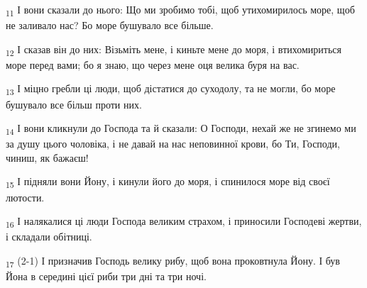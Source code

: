 \begin{tcolorbox}
\textsubscript{11} І вони сказали до нього: Що ми зробимо тобі, щоб утихомирилось море, щоб не заливало нас? Бо море бушувало все більше.
\end{tcolorbox}
\begin{tcolorbox}
\textsubscript{12} І сказав він до них: Візьміть мене, і киньте мене до моря, і втихомириться море перед вами; бо я знаю, що через мене оця велика буря на вас.
\end{tcolorbox}
\begin{tcolorbox}
\textsubscript{13} І міцно гребли ці люди, щоб дістатися до суходолу, та не могли, бо море бушувало все більш проти них.
\end{tcolorbox}
\begin{tcolorbox}
\textsubscript{14} І вони кликнули до Господа та й сказали: О Господи, нехай же не згинемо ми за душу цього чоловіка, і не давай на нас неповинної крови, бо Ти, Господи, чиниш, як бажаєш!
\end{tcolorbox}
\begin{tcolorbox}
\textsubscript{15} І підняли вони Йону, і кинули його до моря, і спинилося море від своєї лютости.
\end{tcolorbox}
\begin{tcolorbox}
\textsubscript{16} І налякалися ці люди Господа великим страхом, і приносили Господеві жертви, і складали обітниці.
\end{tcolorbox}
\begin{tcolorbox}
\textsubscript{17} (2-1) І призначив Господь велику рибу, щоб вона проковтнула Йону. І був Йона в середині цієї риби три дні та три ночі.
\end{tcolorbox}

